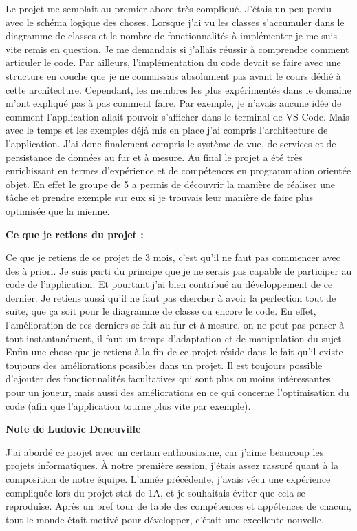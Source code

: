 \documentclass[11pt]{article}
\begin{document}
Le projet me semblait au premier abord très compliqué. J’étais un peu perdu avec le schéma logique des choses. Lorsque j’ai vu les classes s’accumuler dans le diagramme de classes et le nombre de fonctionnalités à implémenter je me suis vite remis en question. Je me demandais si j’allais réussir à comprendre comment articuler le code. Par ailleurs, l’implémentation du code devait se faire avec une structure en couche que je ne connaissais absolument pas avant le cours dédié à cette architecture. Cependant, les membres les plus expérimentés dans le domaine m’ont expliqué pas à pas comment faire. Par exemple, je n'avais aucune idée de comment l’application allait pouvoir s’afficher dans le terminal de VS Code. Mais avec le temps et les exemples déjà mis en place j’ai compris l’architecture de l’application. J’ai donc finalement compris le système de vue, de services et de persistance de données au fur et à mesure. Au final le projet a été très enrichissant en termes d’expérience et de compétences en programmation orientée objet. En effet le groupe de 5 a permis de découvrir la manière de réaliser une tâche et prendre exemple sur eux si je trouvais leur manière de faire plus optimisée que la mienne. 

\bigbreak
\textbf{ Ce que je retiens du projet :   }

Ce que je retiens de ce projet de 3 mois, c’est qu’il ne faut pas commencer avec des à priori. Je suis parti du principe que je ne serais pas capable de participer au code de l’application. Et pourtant j’ai bien contribué au développement de ce dernier. Je retiens aussi qu’il ne faut pas chercher à avoir la perfection tout de suite, que ça soit pour le diagramme de classe ou encore le code. En effet, l'amélioration de ces derniers se fait au fur et à mesure, on ne peut pas penser à tout instantanément, il faut un temps d'adaptation et de manipulation du sujet. Enfin une chose que je retiens à la fin de ce projet réside dans le fait qu’il existe toujours des améliorations possibles dans un projet. Il est toujours possible d’ajouter des fonctionnalités facultatives qui sont plus ou moins intéressantes pour un joueur, mais aussi des améliorations en ce qui concerne l’optimisation du code (afin que l’application tourne plus vite par exemple).

\newpage

\textbf{\Large Note de Ludovic Deneuville}

\bigbreak

J'ai abordé ce projet avec un certain enthousiasme, car j'aime beaucoup les projets informatiques. À notre première session, j'étais assez rassuré quant à la composition de notre équipe. L'année précédente, j'avais vécu une expérience compliquée lors du projet stat de 1A, et je souhaitais éviter que cela se reproduise. Après un bref tour de table des compétences et appétences de chacun, tout le monde était motivé pour développer, c'était une excellente nouvelle.
\end{document}
